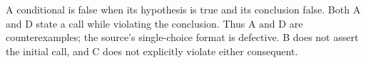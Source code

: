 A conditional is false when its hypothesis is true and its conclusion false. Both A and D state a call while violating the conclusion. Thus $\boxed{\text{A and D}}$ are counterexamples; the source's single-choice format is defective. B does not assert the initial call, and C does not explicitly violate either consequent.
